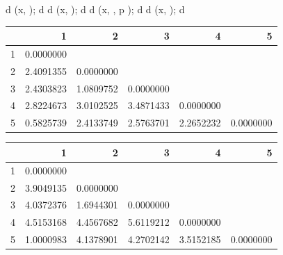 \begin{code}
d \ROperator{<-} (x, ); d
d \ROperator{<-} (x, ); d
d \ROperator{<-} (x, , p \ROperator{=} ); d
d \ROperator{<-} (x, ); d
\end{code}
\par\addvspace{5pt}\begin{center}\begin{minipage}{\linewidth}\centering
\small
{}
\begin{tabular}{lrrrrr}\toprule
 &{\bfseries  1 }&{\bfseries  2 }&{\bfseries  3 }&{\bfseries  4 }&{\bfseries  5}\\\midrule
1 & 0.0000000 &  &  &  & \\
2 & 2.4091355 & 0.0000000 &  &  & \\
3 & 2.4303823 & 1.0809752 & 0.0000000 &  & \\
4 & 2.8224673 & 3.0102525 & 3.4871433 & 0.0000000 & \\
5 & 0.5825739 & 2.4133749 & 2.5763701 & 2.2652232 & 0.0000000\\
\bottomrule\end{tabular}
\end{minipage}\end{center}
\par\addvspace{5pt}\begin{center}\begin{minipage}{\linewidth}\centering
\small
{}
\begin{tabular}{lrrrrr}\toprule
 &{\bfseries  1 }&{\bfseries  2 }&{\bfseries  3 }&{\bfseries  4 }&{\bfseries  5}\\\midrule
1 & 0.0000000 &  &  &  & \\
2 & 3.9049135 & 0.0000000 &  &  & \\
3 & 4.0372376 & 1.6944301 & 0.0000000 &  & \\
4 & 4.5153168 & 4.4567682 & 5.6119212 & 0.0000000 & \\
5 & 1.0000983 & 4.1378901 & 4.2702142 & 3.5152185 & 0.0000000\\
\bottomrule\end{tabular}
\end{minipage}\end{center}
